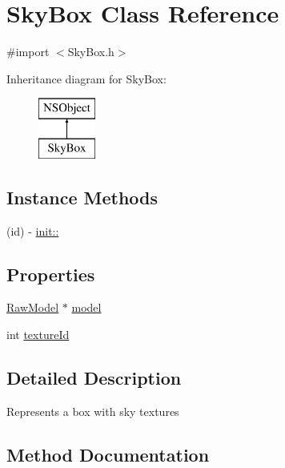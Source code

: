 \hypertarget{interface_sky_box}{}\section{Sky\+Box Class Reference}
\label{interface_sky_box}


{\ttfamily \#import $<$Sky\+Box.\+h$>$}

Inheritance diagram for Sky\+Box\+:\begin{figure}[H]
\begin{center}
\leavevmode
\includegraphics[height=2.000000cm]{interface_sky_box}
\end{center}
\end{figure}
\subsection*{Instance Methods}
\begin{DoxyCompactItemize}
\item 
(id) -\/ \hyperlink{interface_sky_box_af3c3b24551b18d6215fe5d5081d4a311}{init\+::}
\end{DoxyCompactItemize}
\subsection*{Properties}
\begin{DoxyCompactItemize}
\item 
\hyperlink{interface_raw_model}{Raw\+Model} $\ast$ \hyperlink{interface_sky_box_a7fb03172216b3054105f3b04c8e25d59}{model}
\item 
int \hyperlink{interface_sky_box_afe0139e67627fa13a821e58c0e7b746c}{texture\+Id}
\end{DoxyCompactItemize}


\subsection{Detailed Description}
Represents a box with sky textures 

\subsection{Method Documentation}
